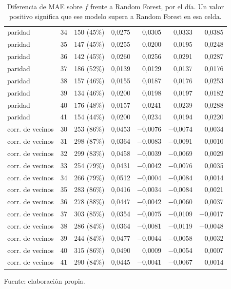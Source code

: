 \begin{table}[htbp]
{\begin{tabular}{@{}lrrrrrr@{}}
        paridad & 34 & 150 (45\%) & 0,0275 & 0,0305 & 0,0333 & 0,0385 \\
        paridad & 35 & 147 (45\%) & 0,0255 & 0,0200 & 0,0195 & 0,0248 \\
        paridad & 36 & 142 (45\%) & 0,0260 & 0,0256 & 0,0291 & 0,0287 \\
        paridad & 37 & 186 (52\%) & 0,0139 & 0,0129 & 0,0137 & 0,0176 \\
        paridad & 38 & 157 (46\%) & 0,0155 & 0,0187 & 0,0176 & 0,0253 \\
        paridad & 39 & 134 (46\%) & 0,0200 & 0,0198 & 0,0197 & 0,0182 \\
        paridad & 40 & 176 (48\%) & 0,0157 & 0,0241 & 0,0239 & 0,0288 \\
        paridad & 41 & 154 (44\%) & 0,0200 & 0,0234 & 0,0194 & 0,0220 \\
        corr. de vecinos & 30 & 253 (86\%) & 0,0453 & $-$0,0076 & $-$0,0074 & 0,0034 \\
        corr. de vecinos & 31 & 298 (87\%) & 0,0364 & $-$0,0083 & $-$0,0091 & 0,0010 \\
        corr. de vecinos & 32 & 299 (83\%) & 0,0458 & $-$0,0039 & $-$0,0069 & 0,0029 \\
        corr. de vecinos & 33 & 254 (79\%) & 0,0431 & $-$0,0042 & $-$0,0076 & 0,0035 \\
        corr. de vecinos & 34 & 266 (79\%) & 0,0512 & $-$0,0004 & $-$0,0084 & 0,0014 \\
        corr. de vecinos & 35 & 283 (86\%) & 0,0416 & $-$0,0034 & $-$0,0084 & 0,0021 \\
        corr. de vecinos & 36 & 278 (88\%) & 0,0447 & $-$0,0042 & $-$0,0060 & 0,0037 \\
        corr. de vecinos & 37 & 303 (85\%) & 0,0354 & $-$0,0075 & $-$0,0109 & $-$0,0017 \\
        corr. de vecinos & 38 & 286 (84\%) & 0,0364 & $-$0,0081 & $-$0,0119 & $-$0,0048 \\
        corr. de vecinos & 39 & 244 (84\%) & 0,0477 & $-$0,0044 & $-$0,0058 & 0,0032 \\
        corr. de vecinos & 40 & 315 (86\%) & 0,0490 & 0,0009 & $-$0,0054 & 0,0007 \\
        corr. de vecinos & 41 & 290 (84\%) & 0,0445 & $-$0,0041 & $-$0,0067 & 0,0014 \\
        \bottomrule
    \end{tabular}}

    \caption{Diferencia de MAE sobre $f$ frente a Random Forest, por el día. Un valor positivo significa que ese modelo supera a Random Forest en esa celda.}
    \label{tab:v3_tiempo_mae_dif}

    {\footnotesize Fuente: elaboración propia.}
\end{table}
